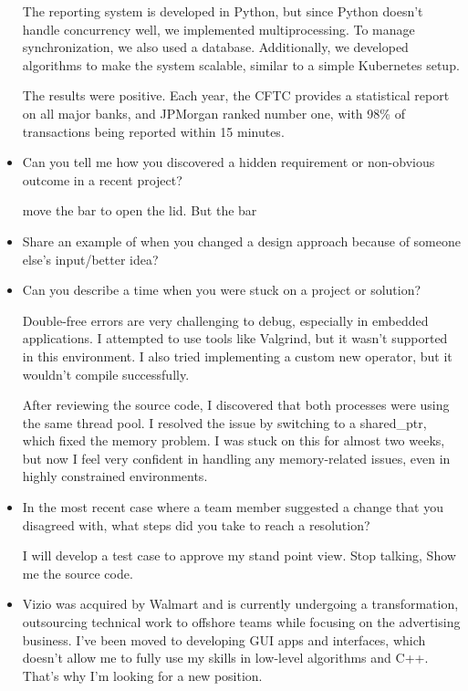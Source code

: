 \documentclass[a4paper,11pt,twoside]{book}
\begin{document}
\begin{itemize}
	The reporting system is developed in Python, but since Python doesn’t handle concurrency well, we implemented multiprocessing. To manage synchronization, we also used a database. Additionally, we developed algorithms to make the system scalable, similar to a simple Kubernetes setup.
	
	The results were positive. Each year, the CFTC provides a statistical report on all major banks, and JPMorgan ranked number one, with 98\% of transactions being reported within 15 minutes.
	
	\item Can you tell me how you discovered a hidden requirement or non-obvious outcome in a recent project?
	
	move the bar to open the lid. But the bar 
	
	\item Share an example of when you changed a design approach because of someone else’s input/better idea?
	
	
	
	
	\item Can you describe a time when you were stuck on a project or solution?
	
	Double-free errors are very challenging to debug, especially in embedded applications. I attempted to use tools like Valgrind, but it wasn’t supported in this environment. I also tried implementing a custom new operator, but it wouldn’t compile successfully.
	
	After reviewing the source code, I discovered that both processes were using the same thread pool. I resolved the issue by switching to a shared\_ptr, which fixed the memory problem. I was stuck on this for almost two weeks, but now I feel very confident in handling any memory-related issues, even in highly constrained environments.
	
	
	\item In the most recent case where a team member suggested a change that you disagreed with, what steps did
	you take to reach a resolution?
	
	I will develop a test case to approve my stand point view. Stop talking, Show me the source code. 
	
	\item Vizio was acquired by Walmart and is currently undergoing a transformation, outsourcing technical work to offshore teams while focusing on the advertising business. I’ve been moved to developing GUI apps and interfaces, which doesn’t allow me to fully use my skills in low-level algorithms and C++. That’s why I’m looking for a new position.
	

\end{itemize}
\end{document}
